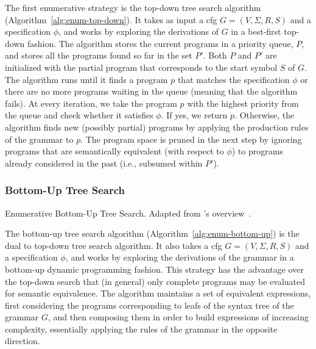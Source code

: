 The first enumerative strategy is the top-down tree search algorithm
(Algorithm~\ref{alg:enum-top-down}).
It takes as input a \gls{cfg} $G = (V, \Sigma{}, R, S)$ and a specification
$\phi{}$, and works by exploring the derivations of $G$ in a best-first top-down
fashion.
The algorithm stores the current programs in a priority queue, $P$, and stores
all the programs found so far in the set $P'$.
Both $P$ and $P'$ are initialized with the partial program that corresponds to
the start symbol $S$ of $G$.
The algorithm runs until it finds a program $p$ that matches the specification
$\phi{}$ or there are no more programs waiting in the queue (meaning that the
algorithm fails).
At every iteration, we take the program $p$ with the highest priority from the
queue and check whether it satisfies $\phi{}$.
If yes, we return $p$.
Otherwise, the algorithm finds new (possibly partial) programs by applying the
production rules of the grammar to $p$.
The program space is pruned in the next step by ignoring programs that are
semantically equivalent (with respect to $\phi{}$) to programs already
considered in the past (i.e., subsumed within $P'$).

\subsubsection{Bottom-Up Tree Search}
\label{sec:bottom-up-tree-search}

\begin{algorithm}
  \DontPrintSemicolon
  \LinesNotNumbered




  \caption{Enumerative Bottom-Up Tree Search.
    Adapted from \citeauthor{Gulwani2017}'s overview~\cite{Gulwani2017}.}
  \label{alg:enum-bottom-up}
\end{algorithm}

The bottom-up tree search algorithm (Algorithm~\ref{alg:enum-bottom-up}) is the
dual to top-down tree search algorithm.
It also takes a \gls{cfg} $G = (V, \Sigma{}, R, S)$ and a specification
$\phi{}$, and works by exploring the derivations of the grammar in a bottom-up
dynamic programming fashion.
This strategy has the advantage over the top-down search that (in general) only
complete programs may be evaluated for semantic equivalence.
The algorithm maintains a set of equivalent expressions, first considering the
programs corresponding to leafs of the syntax tree of the grammar $G$, and then
composing them in order to build expressions of increasing complexity,
essentially applying the rules of the grammar in the opposite direction.

